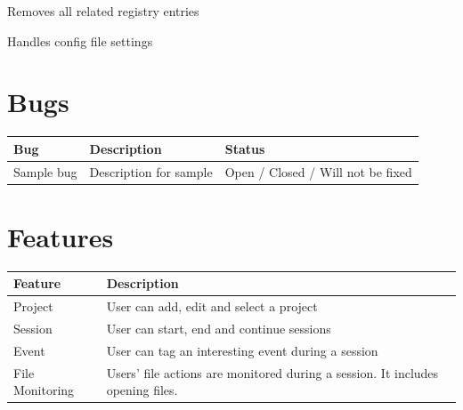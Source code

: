 \documentclass[letterpaper,10pt,english]{sphinxmanual}
\begin{document}
\begin{fulllineitems}
\begin{fulllineitems}
\end{fulllineitems}


\begin{fulllineitems}
\label{api:wos.WORKER_THREAD.RemoveAllRegEntries}
Removes all related registry entries

\end{fulllineitems}


\begin{fulllineitems}
\label{api:wos.WORKER_THREAD.parseConfig}
Handles config file settings

\end{fulllineitems}


\end{fulllineitems}



\chapter{Bugs}
\label{bugs::doc}\label{bugs:bugs}
\begin{tabulary}{\linewidth}{|L|L|L|}
\hline
\textbf{\relax 
Bug
} & \textbf{\relax 
Description
} & \textbf{\relax 
Status
}\\\hline

Sample bug
 & 
Description for sample
 & 
Open / Closed / Will not be fixed
\\\hline
\end{tabulary}



\chapter{Features}
\label{features::doc}\label{features:features}
\begin{tabulary}{\linewidth}{|L|L|}
\hline
\textbf{\relax 
Feature
} & \textbf{\relax 
Description
}\\\hline

Project
 & 
User can add, edit and select a project
\\\hline

Session
 & 
User can start, end and continue sessions
\\\hline

Event
 & 
User can tag an interesting event during  a session
\\\hline

File Monitoring
 & 
Users' file actions are monitored during a session. It includes opening files.
\\\hline
\end{tabulary}
\end{document}
